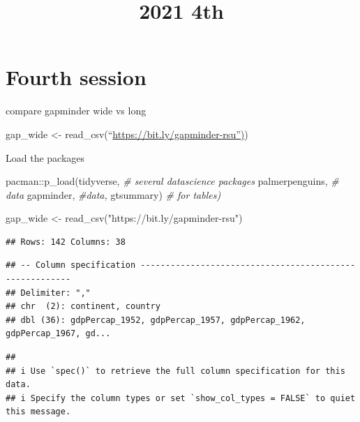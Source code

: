 \documentclass[
]{article}
\title{2021 4th}
\author{}
\date{\vspace{-2.5em}}
\newenvironment{Shaded}{\begin{snugshade}}{\end{snugshade}}
\newcommand{\CommentTok}[1]{\textcolor[rgb]{0.56,0.35,0.01}{\textit{#1}}}
\newcommand{\FunctionTok}[1]{\textcolor[rgb]{0.00,0.00,0.00}{#1}}
\newcommand{\NormalTok}[1]{#1}
\newcommand{\OtherTok}[1]{\textcolor[rgb]{0.56,0.35,0.01}{#1}}
\newcommand{\SpecialCharTok}[1]{\textcolor[rgb]{0.00,0.00,0.00}{#1}}
\newcommand{\StringTok}[1]{\textcolor[rgb]{0.31,0.60,0.02}{#1}}
\begin{document}
\maketitle

\hypertarget{fourth-session}{%
\section{Fourth session}\label{fourth-session}}

compare gapminder wide vs long

gap\_wide \textless-
read\_csv(``\href{https://bit.ly/gapminder-rsu\%22}{https://bit.ly/gapminder-rsu'')})

Load the packages

\begin{Shaded}
\begin{Highlighting}[]
\NormalTok{pacman}\SpecialCharTok{::}\FunctionTok{p\_load}\NormalTok{(tidyverse, }\CommentTok{\# several datascience packages}
\NormalTok{               palmerpenguins, }\CommentTok{\# data}
\NormalTok{               gapminder, }\CommentTok{\#data,}
\NormalTok{               gtsummary) }\CommentTok{\# for tables) }
\end{Highlighting}
\end{Shaded}

\begin{Shaded}
\begin{Highlighting}[]
\NormalTok{gap\_wide }\OtherTok{\textless{}{-}} \FunctionTok{read\_csv}\NormalTok{(}\StringTok{"https://bit.ly/gapminder{-}rsu"}\NormalTok{)}
\end{Highlighting}
\end{Shaded}

\begin{verbatim}
## Rows: 142 Columns: 38
\end{verbatim}

\begin{verbatim}
## -- Column specification --------------------------------------------------------
## Delimiter: ","
## chr  (2): continent, country
## dbl (36): gdpPercap_1952, gdpPercap_1957, gdpPercap_1962, gdpPercap_1967, gd...
\end{verbatim}

\begin{verbatim}
## 
## i Use `spec()` to retrieve the full column specification for this data.
## i Specify the column types or set `show_col_types = FALSE` to quiet this message.
\end{verbatim}
\end{document}
